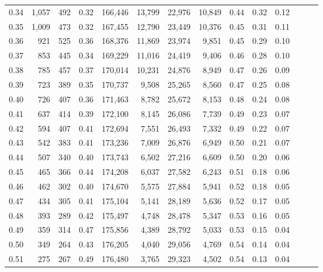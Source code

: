 \begin{tabular}{rrrrrrrrrrrrrr}
0.34 &   1,057 &    492 &  0.32 &  166,446 &   13,799 &  22,976 &  10,849 &  0.44 &  0.32 &      0.12 \\
0.35 &   1,009 &    473 &  0.32 &  167,455 &   12,790 &  23,449 &  10,376 &  0.45 &  0.31 &      0.11 \\
0.36 &     921 &    525 &  0.36 &  168,376 &   11,869 &  23,974 &   9,851 &  0.45 &  0.29 &      0.10 \\
0.37 &     853 &    445 &  0.34 &  169,229 &   11,016 &  24,419 &   9,406 &  0.46 &  0.28 &      0.10 \\
0.38 &     785 &    457 &  0.37 &  170,014 &   10,231 &  24,876 &   8,949 &  0.47 &  0.26 &      0.09 \\
0.39 &     723 &    389 &  0.35 &  170,737 &    9,508 &  25,265 &   8,560 &  0.47 &  0.25 &      0.08 \\
0.40 &     726 &    407 &  0.36 &  171,463 &    8,782 &  25,672 &   8,153 &  0.48 &  0.24 &      0.08 \\
0.41 &     637 &    414 &  0.39 &  172,100 &    8,145 &  26,086 &   7,739 &  0.49 &  0.23 &      0.07 \\
0.42 &     594 &    407 &  0.41 &  172,694 &    7,551 &  26,493 &   7,332 &  0.49 &  0.22 &      0.07 \\
0.43 &     542 &    383 &  0.41 &  173,236 &    7,009 &  26,876 &   6,949 &  0.50 &  0.21 &      0.07 \\
0.44 &     507 &    340 &  0.40 &  173,743 &    6,502 &  27,216 &   6,609 &  0.50 &  0.20 &      0.06 \\
0.45 &     465 &    366 &  0.44 &  174,208 &    6,037 &  27,582 &   6,243 &  0.51 &  0.18 &      0.06 \\
0.46 &     462 &    302 &  0.40 &  174,670 &    5,575 &  27,884 &   5,941 &  0.52 &  0.18 &      0.05 \\
0.47 &     434 &    305 &  0.41 &  175,104 &    5,141 &  28,189 &   5,636 &  0.52 &  0.17 &      0.05 \\
0.48 &     393 &    289 &  0.42 &  175,497 &    4,748 &  28,478 &   5,347 &  0.53 &  0.16 &      0.05 \\
0.49 &     359 &    314 &  0.47 &  175,856 &    4,389 &  28,792 &   5,033 &  0.53 &  0.15 &      0.04 \\
0.50 &     349 &    264 &  0.43 &  176,205 &    4,040 &  29,056 &   4,769 &  0.54 &  0.14 &      0.04 \\
0.51 &     275 &    267 &  0.49 &  176,480 &    3,765 &  29,323 &   4,502 &  0.54 &  0.13 &      0.04 \\

\end{tabular}
